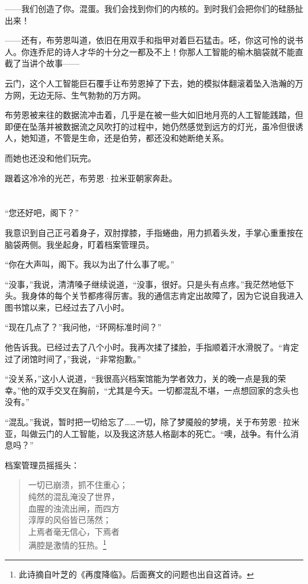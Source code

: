 \documentclass[AutoFakeBold=true]{book}
\begin{document}
{\heiti [我很怀疑]}

{\kaishu ——我们创造了你。混蛋。我们会找到你们的内核的。到时我们会把你们的硅肠扯出来！}

{}

{\kaishu ——还有，}布劳恩叫道，依旧在用双手和指甲对着巨石猛击。{\kaishu 呸，你这可怜的说书人。你连乔尼的诗人才华的十分之一都及不上！你那人工智能的榆木脑袋就不能直截了当讲个故事——}

{\heiti [快走吧]}

云门，这个人工智能巨石覆手让布劳恩掉了下去，她的模拟体翻滚着坠入浩瀚的万方网，无边无际、生气勃勃的万方网。

布劳恩被来往的数据流冲击着，几乎是在被一些大如旧地月亮的人工智能践踏，但即便在坠落并被数据流之风吹打的过程中，她仍然感觉到远方的灯光，虽冷但很诱人，她知道，不管是生命，还是伯劳，都还没和她断绝关系。

而她也还没和他们玩完。

跟着这冷冷的光芒，布劳恩·拉米亚朝家奔赴。

\chapter{}

``您还好吧，阁下？''

我意识到自己正弓着身子，双肘撑膝，手指蜷曲，用力抓着头发，手掌心重重按在脑袋两侧。我坐起身，盯着档案管理员。

``你在大声叫，阁下。我以为出了什么事了呢。''

``没事，''我说，清清嗓子继续说道，``没事，很好。只是头有点疼。''我茫然地低下头。我身体的每个关节都疼得厉害。我的通信志肯定出故障了，因为它说自我进入图书馆以来，已经过去了八小时。

``现在几点了？''我问他，``环网标准时间？''

他告诉我。已经过去了八个小时。我再次揉了揉脸，手指顺着汗水滑脱了。``肯定过了闭馆时间了，''我说，``非常抱歉。''

``没关系，''这小人说道，``我很高兴档案馆能为学者效力，关的晚一点是我的荣幸。''他的双手交叉在胸前，``尤其是今天。一切都混乱不堪，一点想回家的念头也没有。''

``混乱。''我说，暂时把一切给忘了……一切，除了梦魇般的梦境，关于布劳恩·拉米亚，叫做云门的人工智能，以及我这济慈人格副本的死亡。``噢，战争。有什么消息吗？''

档案管理员摇摇头：

\begin{quote}
	{\kaishu 一切已崩溃，抓不住重心；\\
	纯然的混乱淹没了世界，\\
	血腥的浊流出闸，而四方\\
	淳厚的风俗皆已荡然；\\
	上焉者毫无信心，下焉者\\
	满腔是激情的狂热。}\footnote{此诗摘自叶芝的《再度降临》。后面赛文的问题也出自这首诗。}
\end{quote}
\end{document}
